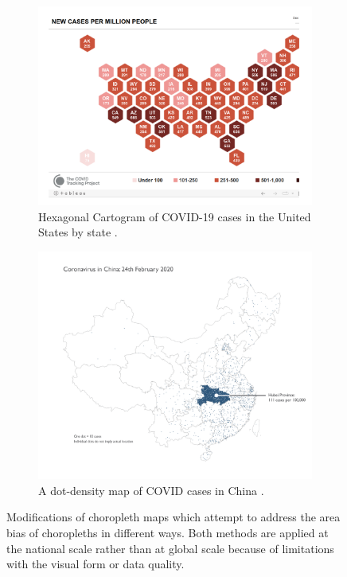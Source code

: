 \documentclass[article]{jdssv}\usepackage[]{graphicx}\usepackage[]{xcolor}
\begin{document}
\begin{figure}
\centering
\begin{subfigure}[c]{\textwidth}
\centering
\includegraphics[width=.65\textwidth]{COVID-tracking-hex-cartogram}
\caption{Hexagonal Cartogram of COVID-19 cases in the United States by state \citep{StateCases1M2021}.}\label{fig:hex-cartogram}
\end{subfigure}

\begin{subfigure}[c]{\textwidth}
\centering
\includegraphics[width=\textwidth]{china-dotmap}
\caption{A dot-density map of COVID cases in China \citep{fieldMappingCoronavirusResponsibly}.}\label{fig:china-dot-map}
\end{subfigure}
\caption{Modifications of choropleth maps which attempt to address the area bias of choropleths in different ways. Both methods are applied at the national scale rather than at global scale because of limitations with the visual form or data quality.}
\end{figure}
\end{document}
